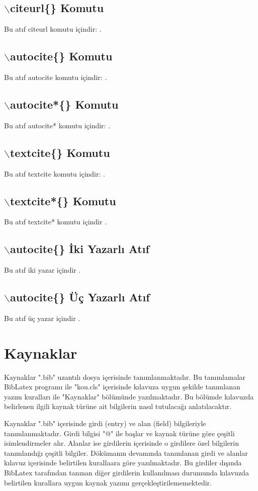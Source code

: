 \subsection{$\backslash$citeurl\{\} Komutu}
Bu atıf citeurl komutu içindir: .
\subsection{$\backslash$autocite\{\} Komutu}
Bu atıf autocite komutu içindir: \autocite{tekyazarArticle}.
\subsection{$\backslash$autocite*\{\} Komutu}
Bu atıf autocite* komutu içindir: \autocite*{tekyazarArticle2}.
\subsection{$\backslash$textcite\{\} Komutu}
Bu atıf textcite komutu içindir: \textcite{tekyazarArticle}.
\subsection{$\backslash$textcite*\{\} Komutu}
Bu atıf textcite* komutu içindir \textcite*{tekyazarArticle2}.
\subsection{$\backslash$autocite\{\} İki Yazarlı Atıf}
Bu atıf iki yazar içindir \autocite{ikiyazarArticle}.
\subsection{$\backslash$autocite\{\} Üç Yazarlı Atıf}
Bu atıf üç yazar içindir \autocite{ucyazarArticle}.

\section{Kaynaklar}
Kaynaklar ".bib" uzantılı dosya içerisinde tanımlanmaktadır. Bu tanımlamalar BibLatex programı ile "kou.cls" içerisinde kılavuza uygun şekilde tanımlanan yazım kuralları ile "Kaynaklar" bölümünde yazılmaktadır. Bu bölümde kılavuzda belirlenen ilgili kaynak türüne ait bilgilerin nasıl tutulacağı anlatılacaktır. 

Kaynaklar ".bib" içerisinde girdi (entry) ve alan (field) bilgileriyle tanımlanmaktadır. Girdi bilgisi "@" ile başlar ve kaynak türüne göre çeşitli isimlendirmeler alır. Alanlar ise girdilerin içerisinde o girdilere özel bilgilerin tanımlandığı çeşitli bilgiler. Dökümanın devamında tanımlanan girdi ve alanlar kılavuz içerisinde belirtilen kurallaara göre yazılmaktadır. Bu girdiler dışında BibLatex tarafından tanınan diğer girdilerin kullanılması durumunda kılavuzda belirtilen kurallara uygun kaynak yazımı gerçekleştirilememektedir.

